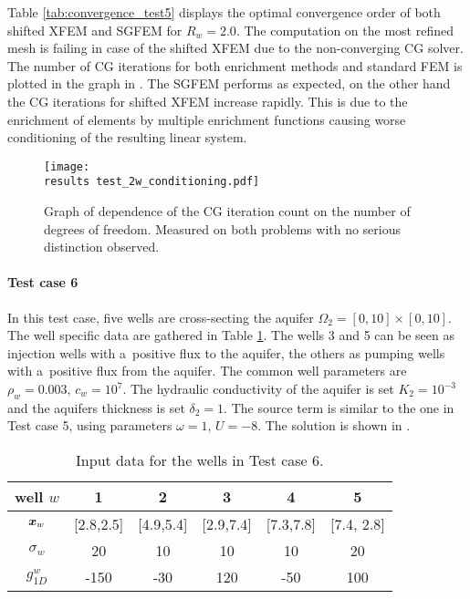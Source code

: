 Table \ref{tab:convergence_test5} displays the optimal convergence order of both shifted XFEM and SGFEM for $R_w=2.0$.
The computation on the most refined mesh is failing in case of the shifted XFEM due to the non-converging CG solver.
The number of CG iterations for both enrichment methods and standard FEM is plotted in the graph in .
The SGFEM performs as expected, on the other hand the CG iterations for shifted XFEM increase rapidly.
This is due to the enrichment of elements by multiple enrichment functions causing worse conditioning of the resulting linear system.
%
\begin{figure}[!htb]
  \centering    
    \texttt{[image: \\results test\_2w\_conditioning.pdf]}
  \caption[CG iterations count in Test case 3]{Graph of dependence of the CG iteration count on the 
  number of degrees of freedom. Measured on both problems with no serious distinction observed.}
  \label{fig:test_2w_conditioning}
\end{figure}



\paragraph{Test case 6}
In this test case, five wells are cross-secting the aquifer $\Omega_2 = [0,10]\times[0, 10]$.
The well specific data are gathered in Table \ref{tab:test_case6_wells_data}.
The wells 3 and 5 can be seen as injection wells with a~positive flux to the aquifer, the others as pumping wells with a~positive flux from the aquifer.
The common well parameters are $\rho_w = 0.003$, $c_w = 10^{7}$.
The hydraulic conductivity of the aquifer is set $K_2=10^{-3}$ and the aquifers thickness is set $\delta_2=1$.
The source term is similar to the one in Test case 5, using parameters $\omega=1$, $U=-8$.
The solution is shown in .
%
\begin{table}
\begin{center}
\begin{tabular}{c|ccccc}
\toprule
well $w$ & 1 & 2 & 3 & 4 & 5 \\
\midrule
$\mathbf{\boldsymbol{x}}_w$     & [2.8,2.5]  & [4.9,5.4]  & [2.9,7.4]  & [7.3,7.8] & [7.4, 2.8] \\
$\sigma_w$  & 20   & 10  & 10  & 10  & 20 \\
$g^w_{1D}$  & -150 & -30 & 120 & -50 & 100 \\
\bottomrule
\end{tabular}
\caption{Input data for the wells in Test case 6.}
\label{tab:test_case6_wells_data}
\end{center}
\end{table}

